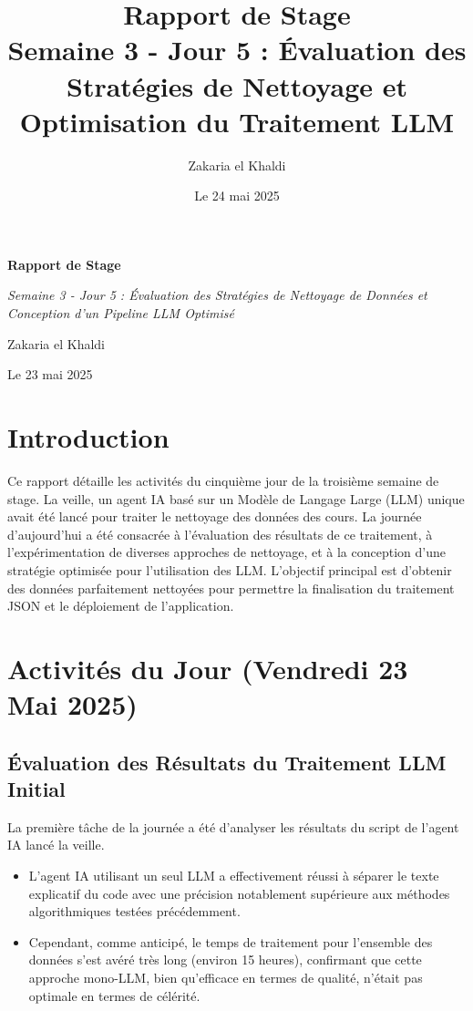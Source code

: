 \documentclass[12pt, a4paper]{article}
\title{\Huge\bfseries\color{primary} Rapport de Stage \\ 
      \Large Semaine 3 - Jour 5 : Évaluation des Stratégies de Nettoyage et Optimisation du Traitement LLM}
\author{\Large Zakaria el Khaldi}
\date{\large Le 24 mai 2025} %
\begin{document}
\begin{titlepage}
  \centering
  {\Huge\bfseries\color{primary} Rapport de Stage \par}
  \vspace{1cm}
  {\Large\itshape Semaine 3 - Jour 5 : Évaluation des Stratégies de Nettoyage de Données et Conception d'un Pipeline LLM Optimisé\par}
  \vspace{2cm}
  
  \vspace{2cm}
  {\Large Zakaria el Khaldi\par}
  \vfill
  {\large Le 23 mai 2025\par} %
\end{titlepage}

\tableofcontents
\thispagestyle{empty}
\newpage

\section{Introduction}
\thispagestyle{fancy}
Ce rapport détaille les activités du cinquième jour de la troisième semaine de stage. La veille, un agent IA basé sur un Modèle de Langage Large (LLM) unique avait été lancé pour traiter le nettoyage des données des cours. La journée d'aujourd'hui a été consacrée à l'évaluation des résultats de ce traitement, à l'expérimentation de diverses approches de nettoyage, et à la conception d'une stratégie optimisée pour l'utilisation des LLM. L'objectif principal est d'obtenir des données parfaitement nettoyées pour permettre la finalisation du traitement JSON et le déploiement de l'application.

\section{Activités du Jour (Vendredi 23 Mai 2025)}

\subsection{Évaluation des Résultats du Traitement LLM Initial}
La première tâche de la journée a été d'analyser les résultats du script de l'agent IA lancé la veille.
\begin{itemize}
    \item L'agent IA utilisant un seul LLM a effectivement réussi à séparer le texte explicatif du code avec une précision notablement supérieure aux méthodes algorithmiques testées précédemment.
    \item Cependant, comme anticipé, le temps de traitement pour l'ensemble des données s'est avéré très long (environ 15 heures), confirmant que cette approche mono-LLM, bien qu'efficace en termes de qualité, n'était pas optimale en termes de célérité.
\end{itemize}
\end{document}
